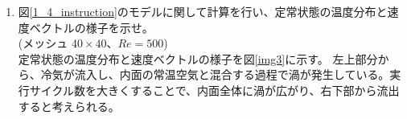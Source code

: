 \begin{enumerate}
  $Ra=10^5$において$Nu$数が変化する様子を図\ref{im2}に示す。\\
  メッシュ数が0～40の値域の時、平均ヌッセルト数は単調増加傾向である。
  しかし、メッシュ数の地域が50以上になると、平均ヌッセルト数の値の変化傾向が定まらず、振動する。
  これは、ヌッセルト数の導出式において、メッシュ数を無限大とした時の極限値が収束も発散もしないためだと考えられる。
  \newpage
  \begin{figure}[htb]
    \begin{center}
    \caption{$Ra=10^5$において$Nu$数が変化する様子}
    \label{im2}
    \end{center}
  \end{figure}
  \item 図\ref{1_4_instruction}のモデルに関して計算を行い、定常状態の温度分布と速度ベクトルの様子を示せ。\\(メッシュ $40 \times 40$、$Re = 500$)\\
  定常状態の温度分布と速度ベクトルの様子を図\ref{img3}に示す。
  左上部分から、冷気が流入し、内面の常温空気と混合する過程で渦が発生している。実行サイクル数を大きくすることで、内面全体に渦が広がり、右下部から流出すると考えられる。
  

\end{enumerate}

